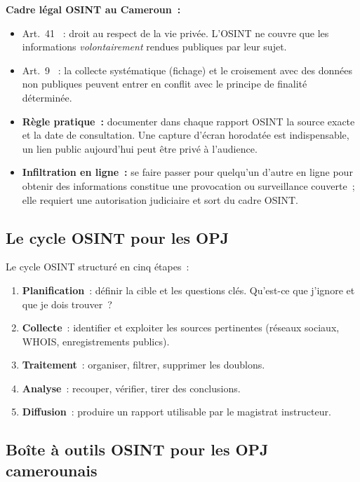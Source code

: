 \begin{boxjuris}
\textbf{Cadre légal OSINT au Cameroun~:}
\begin{itemize}
    \item Art.~41 ~: droit au respect de la vie privée.
          L'OSINT ne couvre que les informations \emph{volontairement}
          rendues publiques par leur sujet.
    \item Art.~9 ~: la collecte systématique (fichage)
          et le croisement avec des données non publiques peuvent
          entrer en conflit avec le principe de finalité déterminée.
    \item \textbf{Règle pratique~:} documenter dans chaque rapport OSINT
          la source exacte et la date de consultation. Une capture d'écran
          horodatée est indispensable, un lien public aujourd'hui peut
          être privé à l'audience.
    \item \textbf{Infiltration en ligne~:} se faire passer pour quelqu'un
          d'autre en ligne pour obtenir des informations constitue une
          provocation ou surveillance couverte~; elle requiert une
          autorisation judiciaire et sort du cadre OSINT.
\end{itemize}
\end{boxjuris}

\subsection{Le cycle OSINT pour les OPJ}

Le cycle OSINT structuré en cinq étapes~:
\begin{enumerate}
    \item \textbf{Planification}~: définir la cible et les questions
          clés. Qu'est-ce que j'ignore et que je dois trouver~?
    \item \textbf{Collecte}~: identifier et exploiter les sources
          pertinentes (réseaux sociaux, WHOIS, enregistrements publics).
    \item \textbf{Traitement}~: organiser, filtrer, supprimer les doublons.
    \item \textbf{Analyse}~: recouper, vérifier, tirer des conclusions.
    \item \textbf{Diffusion}~: produire un rapport utilisable par le
          magistrat instructeur.
\end{enumerate}

\subsection{Boîte à outils OSINT pour les OPJ camerounais}

